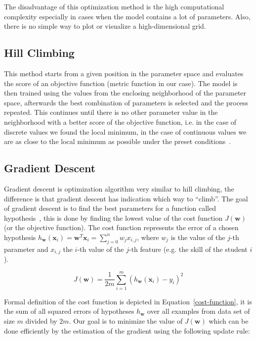 The disadvantage of this optimization method is the high computational complexity especially in cases when the model contains a lot of parameters. Also, there is no simple way to plot or visualize a high-dimensional grid.

\subsection{Hill Climbing}
\label{hill-climbing}

This method starts from a given position in the parameter space and evaluates the score of an objective function (metric function in our case). The model is then trained using the values from the enclosing neighborhood of the parameter space, afterwards the best combination of parameters is selected and the process repeated. This continues until there is no other parameter value in the neighborhood with a better score of the objective function, i.e. in the case of discrete values we found the local minimum, in the case of continuous values we are as close to the local minimum as possible under the preset conditions~\cite{Russell2009}.

\subsection{Gradient Descent}
\label{gradient-descent}

Gradient descent is optimization algorithm very similar to hill climbing, the difference is that gradient descent has indication which way to ``climb''. The goal of gradient descent is to find the best parameters for a function called hypothesis~\cite{Klusasek2014}, this is done by finding the lowest value of the cost function $J(\mathbf{w})$ (or the objective function). The cost function represents the error of a chosen hypothesis $h_{\mathbf{w}}(\mathbf{x}_i) = \mathbf{w}^T \mathbf{x}_i = \sum^n_{j=0} w_j x_{i,j}$, where $w_j$ is the value of the $j$-th parameter and $x_{i,j}$ the $i$-th value of the $j$-th feature (e.g. the skill of the student $i$).

\begin{equation} \label{cost-function}
  J(\mathbf{w}) = \frac{1}{2m} \sum^m_{i=1} (h_{\mathbf{w}}(\mathbf{x}_i) - y_i)^2
\end{equation}

Formal definition of the cost function is depicted in Equation~\ref{cost-function}, it is the sum of all squared errors of hypotheses $h_{\mathbf{w}}$ over all examples from data set of size $m$ divided by $2m$. Our goal is to minimize the value of $J(\mathbf{w})$ which can be done efficiently by the estimation of the gradient using the following update rule:

